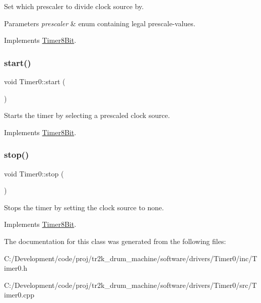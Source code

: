 Set which prescaler to divide clock source by. 
\begin{DoxyParams}{Parameters}
{\em prescaler} & enum containing legal prescale-\/values. \\
\hline
\end{DoxyParams}


Implements \mbox{\hyperlink{class_timer8_bit}{Timer8\+Bit}}.

\mbox{\label{class_timer0_a8294e4507ea1b68e090ea77a847257c2}} 
\subsubsection{\texorpdfstring{start()}{start()}}
{\footnotesize\ttfamily void Timer0\+::start (\begin{DoxyParamCaption}{ }\end{DoxyParamCaption})\hspace{0.3cm}{\ttfamily [virtual]}}

Starts the timer by selecting a prescaled clock source. 

Implements \mbox{\hyperlink{class_timer8_bit}{Timer8\+Bit}}.

\mbox{\label{class_timer0_a423cccd0c305d4e552de970b7e71fd0b}} 
\subsubsection{\texorpdfstring{stop()}{stop()}}
{\footnotesize\ttfamily void Timer0\+::stop (\begin{DoxyParamCaption}{ }\end{DoxyParamCaption})\hspace{0.3cm}{\ttfamily [virtual]}}

Stops the timer by setting the clock source to none. 

Implements \mbox{\hyperlink{class_timer8_bit}{Timer8\+Bit}}.



The documentation for this class was generated from the following files\+:\begin{DoxyCompactItemize}
\item 
C\+:/\+Development/code/proj/tr2k\+\_\+drum\+\_\+machine/software/drivers/\+Timer0/inc/Timer0.\+h\item 
C\+:/\+Development/code/proj/tr2k\+\_\+drum\+\_\+machine/software/drivers/\+Timer0/src/Timer0.\+cpp\end{DoxyCompactItemize}

